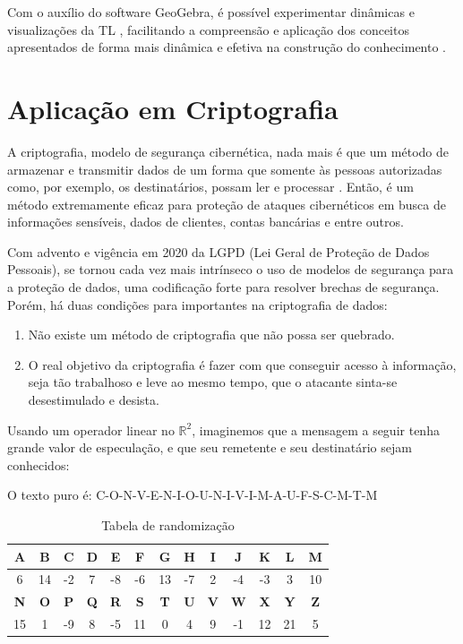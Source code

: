 Com o auxílio do software GeoGebra, é possível experimentar dinâmicas e visualizações da TL \cite{eliza2015}, facilitando a compreensão e aplicação dos conceitos apresentados de forma mais dinâmica e efetiva na construção do conhecimento \cite{souzasilzaeliza2017}.

\section{Aplicação em Criptografia}
A criptografia, modelo de segurança cibernética, nada mais é que um método de armazenar e transmitir dados de um forma que somente às pessoas autorizadas como, por exemplo, os destinatários, possam ler e processar \cite{helio2009}. Então, é um método extremamente eficaz para proteção de ataques cibernéticos em busca de informações sensíveis, dados de clientes, contas bancárias e entre outros.

Com advento e vigência em 2020 da LGPD (Lei Geral de Proteção de Dados Pessoais), se tornou cada vez mais intrínseco o uso de modelos de segurança para a proteção de dados, uma codificação forte para resolver brechas de segurança. Porém, há duas condições para importantes na criptografia de dados:

\begin{enumerate}
	\item Não existe um método de criptografia que não possa ser quebrado.
	\item O real objetivo da criptografia é fazer com que conseguir acesso à informação, seja tão trabalhoso e leve ao mesmo tempo, que o atacante sinta-se desestimulado e desista.
\end{enumerate}

Usando um operador linear no $\mathbb{R}^2$, imaginemos que a mensagem a seguir tenha grande valor de especulação, e que seu remetente e seu destinatário sejam conhecidos:

\centerline{O texto puro é: C-O-N-V-E-N-I-O-U-N-I-V-I-M-A-U-F-S-C-M-T-M}

\begin{table}[h]
	\centering
	\begin{tabular}{@{} *{13}{c} @{}}
		\toprule
		\textbf{A} & \textbf{B} & \textbf{C} & \textbf{D} & \textbf{E} & \textbf{F} & \textbf{G} & \textbf{H} & \textbf{I} & \textbf{J} & \textbf{K} & \textbf{L} & \textbf{M} \\
		\midrule
		6          & 14         & -2         & 7          & -8         & -6         & 13         & -7         & 2          & -4         & -3         & 3          & 10         \\
		\toprule
		\textbf{N} & \textbf{O} & \textbf{P} & \textbf{Q} & \textbf{R} & \textbf{S} & \textbf{T} & \textbf{U} & \textbf{V} & \textbf{W} & \textbf{X} & \textbf{Y} & \textbf{Z} \\
		\midrule
		15         & 1          & -9         & 8          & -5         & 11         & 0          & 4          & 9          & -1         & 12         & 21         & 5          \\
		\bottomrule
	\end{tabular}
	\caption{Tabela de randomização \cite{helio2009}}
\end{table}

